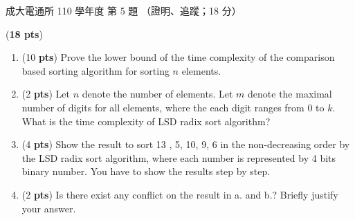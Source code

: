 \begin{pastexam}[label={px:ncku-110-cce-ds-05}]{成大電通所 110 學年度 第 5 題}
（證明、追蹤；18 分）

(\textbf{18 pts})
\begin{enumerate}[label=\alph*.]
\item (10 \textbf{pts}) Prove the lower bound of the time complexity of the comparison based sorting algorithm for sorting $n$ elements.
\item (2 \textbf{pts}) Let $n$ denote the number of elements. Let $m$ denote the maximal number of digits for all elements, where the each digit ranges from 0 to $k$.\\
What is the time complexity of LSD radix sort algorithm?
\item (4 \textbf{pts}) Show the result to sort 13 , 5, 10, 9, 6 in the non-decreasing order by the LSD radix sort algorithm, where each number is represented by 4 bits binary number. You have to show the results step by step.
\item (2 \textbf{pts}) Is there exist any conflict on the result in a. and b.? Briefly justify your answer.
\end{enumerate}
\end{pastexam}

